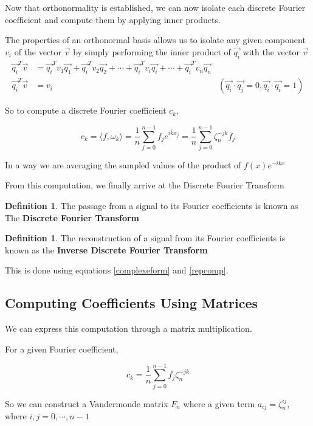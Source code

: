 \documentclass[11pt]{amsart}
\theoremstyle{definition}
\newtheorem{defn}[thm]{Definition}
\theoremstyle{remark}
\numberwithin{equation}{section}
\begin{document}
Now that orthonormality is established, we can now isolate each discrete Fourier coefficient and compute them by applying inner products.

The properties of an orthonormal basis allows us to isolate any given component $v_i$ of the vector $\vec{v}$ by simply performing the inner product of $\vec{q_i}$ with the vector $\vec{v}$
\begin{align*}
	\vec{q_i}^T\vec{v} &= \vec{q_i}^T v_1 \vec{q_1} + \vec{q_i}^T v_2 \vec{q_2} + \cdots + \vec{q_i}^T v_i \vec{q_i} + \cdots + \vec{q_i}^T v_n \vec{q_n} \\
	\vec{q_i}^T \vec{v} &= v_i &(\vec{q_i}\cdot \vec{q_j} = 0, \vec{q_i} \cdot \vec{q_i} = 1)
\end{align*}


So to compute a discrete Fourier coefficient $c_k$,

\[
	c_k = \langle f, \omega_k \rangle = \frac{1}{n} \sum_{j=0}^{n-1} f_j \overline{e^{ikx_j}} = \frac{1}{n} \sum_{j=0}^{n-1} \zeta_n^{-jk} f_j
\]

In a way we are averaging the sampled values of the product of $f(x) e^{-ikx}$

From this computation, we finally arrive at the Discrete Fourier Transform

\begin{defn}
The passage from a signal to its Fourier coefficients is known as The \textbf{Discrete Fourier Transform}
\end{defn}


\begin{defn}
The reconstruction of a signal from its Fourier coefficients is known as the \textbf{Inverse Discrete Fourier Transform}
\end{defn}

This is done using equations \ref{complexeform} and \ref{repcomp}.
\subsection{Computing Coefficients Using Matrices }
We can express this computation through a matrix multiplication.

For a given Fourier coefficient,

\[
	{c}_k = \frac{1}{n}\sum_{j=0}^{n-1} f_j \zeta_n^{-jk}
\]

So we can construct a Vandermonde matrix $F_n$ where a given term $a_{ij} = \zeta_n^{ij}$, where $i,j = 0, \cdots, {n-1}$
\end{document}

